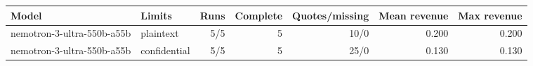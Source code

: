 \begin{tabular}{@{}llrrrrr@{}}
\toprule
Model & Limits & Runs & Complete & Quotes/missing & Mean revenue & Max revenue \\
\midrule
nemotron-3-ultra-550b-a55b & plaintext & 5/5 & 5 & 10/0 & 0.200 & 0.200 \\
nemotron-3-ultra-550b-a55b & confidential & 5/5 & 5 & 25/0 & 0.130 & 0.130 \\
\bottomrule
\end{tabular}
